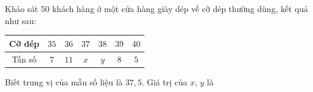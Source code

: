 \begin{ex}
Khảo sát $50$ khách hàng ở một cửa hàng giày dép về cỡ dép thường dùng, kết quả như sau:
\begin{center}
\begin{tabular}{|c|c|c|c|c|c|c|}\hline
Cỡ dép & $35$ & $36$ & $37$ & $38$ & $39$ & $40$\\\hline
Tần số & $7$ & $11$ & $x$ & $y$ & $8$ & $5$\\\hline
\end{tabular}
\end{center}
Biết trung vị của mẫu số liệu là $37{,}5$. Giá trị của $x$, $y$ là
\end{ex}
